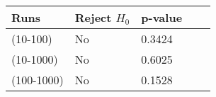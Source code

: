 
\begin{tabular}{lllll}

{\bf Runs} & {\bf Reject $H_0$} & {\bf p-value}  \\ \hline

(10-100) & No & 0.3424  \\
(10-1000) & No & 0.6025 \\
(100-1000) & No & 0.1528 \\

\hline
\end{tabular}
